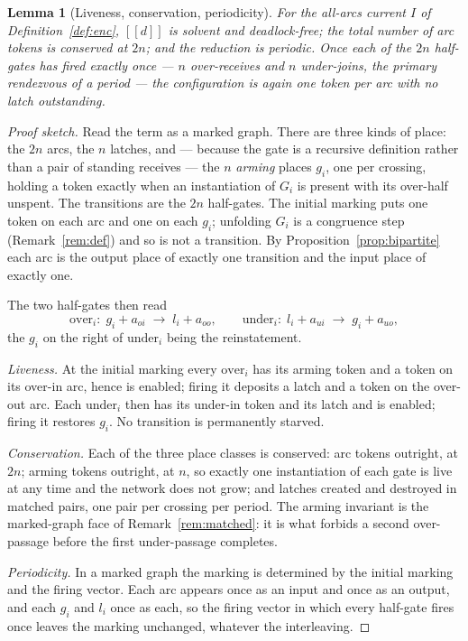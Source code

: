 \documentclass[11pt]{article}
\newtheorem{lemma}{Lemma}
\theoremstyle{definition}
\newcommand{\enc}[1]{[\![ #1 ]\!]}
\begin{document}
\begin{lemma}[Liveness, conservation, periodicity]\label{lem:live}
For the all-arcs current $I$ of Definition~\ref{def:enc}, $\enc{d}$ is solvent and
deadlock-free; the total number of arc tokens is conserved at $2n$; and the
reduction is periodic. Once each of the $2n$ half-gates has fired exactly once
--- $n$ over-receives and $n$ under-joins, the \emph{primary} rendezvous of a
period --- the configuration is again one token per arc with no latch outstanding.
\end{lemma}
\begin{proof}[Proof sketch]
Read the term as a marked graph. There are three kinds of place: the $2n$ arcs,
the $n$ latches, and --- because the gate is a recursive definition rather than a
pair of standing receives --- the $n$ \emph{arming} places $g_i$, one per
crossing, holding a token exactly when an instantiation of $G_i$ is present with
its over-half unspent. The transitions are the $2n$ half-gates. The initial
marking puts one token on each arc and one on each $g_i$; unfolding $G_i$ is a
congruence step (Remark~\ref{rem:def}) and so is not a transition. By
Proposition~\ref{prop:bipartite} each arc is the output place of exactly one
transition and the input place of exactly one.

The two half-gates then read
\[
\text{over}_i\colon\; g_i + a_{oi} \;\longrightarrow\; l_i + a_{oo},
\qquad
\text{under}_i\colon\; l_i + a_{ui} \;\longrightarrow\; g_i + a_{uo},
\]
the $g_i$ on the right of $\text{under}_i$ being the reinstatement.

\emph{Liveness.} At the initial marking every $\text{over}_i$ has its arming token
and a token on its over-in arc, hence is enabled; firing it deposits a latch and a
token on the over-out arc. Each $\text{under}_i$ then has its under-in token and
its latch and is enabled; firing it restores $g_i$. No transition is permanently
starved.

\emph{Conservation.} Each of the three place classes is conserved: arc tokens
outright, at $2n$; arming tokens outright, at $n$, so exactly one instantiation of
each gate is live at any time and the network does not grow; and latches created
and destroyed in matched pairs, one pair per crossing per period. The arming
invariant is the marked-graph face of Remark~\ref{rem:matched}: it is what forbids
a second over-passage before the first under-passage completes.

\emph{Periodicity.} In a marked graph the marking is determined by the initial
marking and the firing vector. Each arc appears once as an input and once as an
output, and each $g_i$ and $l_i$ once as each, so the firing vector in which every
half-gate fires once leaves the marking unchanged, whatever the interleaving.
\end{proof}
\end{document}
